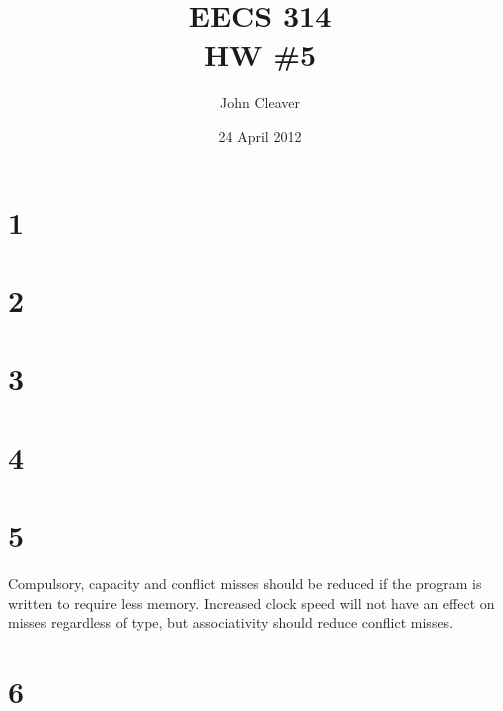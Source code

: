 \documentclass{article}
\title{EECS 314 \\ HW \#5}
\author{John Cleaver}
\date{24 April 2012}
\begin{document}
\maketitle

\section*{1}

\section*{2} 

\section*{3}

\section*{4}

\section*{5} 

Compulsory, capacity and conflict misses should be reduced if the program is written to require less memory. Increased clock speed will not have an effect on misses regardless of type, but associativity should reduce conflict misses.

\section*{6}
\end{document}
